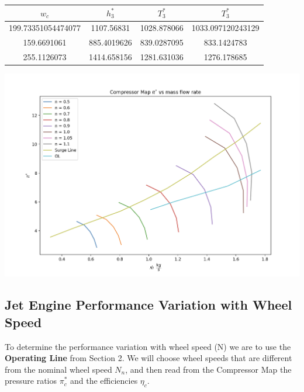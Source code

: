 \documentclass[titlepage]{article}
\begin{document}
\begin{enumerate}
  \begin{center}
    \begin{tabular}{|c|c|c|c|}
      \hline
      $w_{c}$ & $h_{3}^{*}$ & $T_{3}^{*}$ & $T_{3}^{*}$ \\
      \hline
      199.73351054474077	& 1107.56831	& 1028.878066	& 1033.097120243129 \\
      \hline
      159.6691061	& 885.4019626 &	839.0287095 & 833.1424783 \\
      \hline
      255.1126073	& 1414.658156	& 1281.631036 & 1276.178685 \\
      \hline
    \end{tabular}
  \end{center}
  
  
  
  \end{enumerate}
  
  \begin{center}
    \includegraphics[width=\textwidth]{CompressorMap.png}
  \end{center}
  
  \vspace{2cm}

  \subsection{Jet Engine Performance Variation with Wheel Speed}

  To determine the performance variation with wheel speed (N) we are to use the \textbf{Operating Line} from Section 2. We will choose wheel speeds that are different 
from the nominal wheel speed $N_{n}$, and then read from the Compressor Map the pressure ratios $\pi_{c}^{*}$ and the efficiencies $\eta_{c}$.
\end{document}
